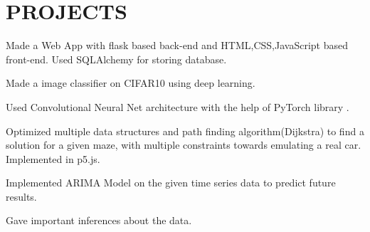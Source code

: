 \documentclass[]{deedy-resume-openfont}
\begin{document}
\hfill
\begin{minipage}[t]{0.66\textwidth} 



\section{PROJECTS}

\vspace{\topsep} %
\begin{tightemize}
\item Made a Web App with flask based back-end and HTML,CSS,JavaScript based front-end. Used SQLAlchemy for storing database.
\end{tightemize}

\sectionsep



\begin{tightemize}
\item Made a image classifier on CIFAR10 using deep learning.  
\item Used Convolutional Neural Net architecture with the help of PyTorch library .
\end{tightemize}
\sectionsep

\begin{tightemize}
\item Optimized multiple data structures and path finding algorithm(Dijkstra) to find a solution for a given maze, with multiple constraints towards emulating a real car. Implemented in p5.js.

\end{tightemize}
\sectionsep

\begin{tightemize}
\item Implemented ARIMA Model on the given time series data to predict future results.
\item Gave important inferences about the data.

\end{tightemize}
\sectionsep



\end{minipage}
\end{document}
